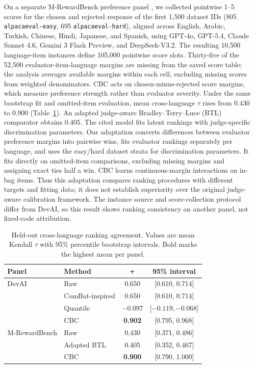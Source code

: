 \documentclass[sigconf,anonymous]{aamas}
\begin{document}
On a separate M-RewardBench preference panel
\citep{gureja-etal-2025-rewardbench}, we collected pointwise 1--5 scores
for the chosen and rejected response of the first 1{,}500 dataset IDs
(805 \texttt{alpacaeval-easy}, 695 \texttt{alpacaeval-hard}), aligned across
English, Arabic, Turkish, Chinese, Hindi, Japanese, and Spanish,
using GPT-4o, GPT-5.4, Claude Sonnet 4.6,
Gemini 3 Flash Preview, and DeepSeek-V3.2. The resulting
10{,}500 language-item instances define 105{,}000 pointwise score slots.
Thirty-five of the 52{,}500 evaluator-item-language margins are missing
from the saved score table; the analysis averages available margins
within each cell, excluding missing scores from weighted denominators.
CBC acts on chosen-minus-rejected score margins, which measure preference
strength rather than evaluator severity. Under the same
bootstrap fit and omitted-item evaluation, mean cross-language $\tau$
rises from $0.430$ to $0.900$ (Table~\ref{tab:ranking}). An adapted
judge-aware Bradley--Terry--Luce (BTL) comparator
\citep{xu2026judgeaware} obtains $0.405$. The cited model fits latent
rankings with judge-specific discrimination parameters. Our adaptation
converts differences between evaluator preference margins into pairwise
wins, fits evaluator rankings separately per language, and uses the
easy/hard dataset strata for discrimination parameters. It fits directly
on omitted-item comparisons, excluding missing margins and assigning
exact ties half a win. CBC learns continuous-margin interactions on
in-bag items. Thus this adaptation compares ranking procedures with
different targets and fitting data; it does not establish superiority
over the original judge-aware calibration framework.
The instance source and
score-collection protocol differ from DevAI, so this result shows
ranking consistency on another panel, not fixed-code attribution.

\begin{table}[t]\centering\small
\setlength{\tabcolsep}{3pt}
\caption{Held-out cross-language ranking agreement. Values are mean
Kendall $\tau$ with 95\% percentile bootstrap intervals.
Bold marks the highest mean per panel.}
\label{tab:ranking}
\begin{tabular*}{\columnwidth}{@{\extracolsep{\fill}}llcc@{}}\toprule
\textbf{Panel} & \textbf{Method} & $\boldsymbol{\tau}$ & \textbf{95\% interval}\\\midrule
DevAI & Raw & 0.650 & [0.610, 0.714]\\
 & ComBat-inspired & 0.650 & [0.610, 0.714]\\
 & Quantile & $-0.097$ & [$-0.119,-0.068$]\\
 & CBC & \textbf{0.902} & [0.795, 0.968]\\\midrule
M-RewardBench & Raw & 0.430 & [0.371, 0.486]\\
 & Adapted BTL & 0.405 & [0.352, 0.467]\\
 & CBC & \textbf{0.900} & [0.790, 1.000]\\
\bottomrule\end{tabular*}
\end{table}
\end{document}

